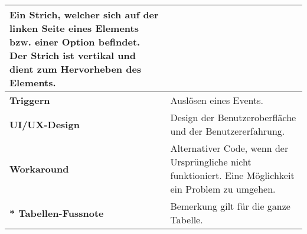 \begin{table}[!ht]
\begin{adjustbox}{max width=\textwidth}
\begin{threeparttable}
\begin{tabular}{ p{\glossarywithTitle} | p{\glossarywith} }
                    Ein Strich, welcher sich auf der linken Seite eines Elements bzw. einer Option befindet. 
                    Der Strich ist vertikal und dient zum Hervorheben des Elements. \\
                \hline
                \bf{Triggern} & Auslösen eines Events. \\
                \hline
                \bf{UI/UX-Design} & Design der Benutzeroberfläche und der Benutzererfahrung. \\
                \hline
                \bf{Workaround} & 
                    Alternativer Code, wenn der Ursprüngliche nicht funktioniert. 
                    Eine Möglichkeit ein Problem zu umgehen. \\
                \hline
                \hline
                \raggedright \bf{* Tabellen-Fussnote} & Bemerkung gilt für die ganze Tabelle. \\
                \hline
            \end{tabular}
        \end{threeparttable}
    \end{adjustbox}
\end{table}
